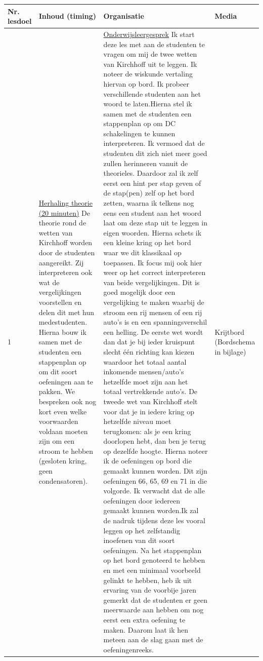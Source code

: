 \begin{landscape}
\begin{tabularx}{1.56\textwidth}{|p{1.5cm}|p{6cm}|X|p{3cm}|}
	\hline
	\textbf{Nr. lesdoel } & \textbf{Inhoud (timing)}  & \textbf{Organisatie } & \textbf{Media } \\ \hline
	1\newline 2 &\underline{Herhaling theorie (20 minuten)}\newline
	De theorie rond de wetten van Kirchhoff worden door de studenten aangereikt. Zij interpreteren ook wat de vergelijkingen voorstellen en delen dit met hun medestudenten. Hierna bouw ik samen met de studenten een stappenplan op om dit soort oefeningen aan te pakken. We bespreken ook nog kort even welke voorwaarden voldaan moeten zijn om een stroom te hebben (gesloten kring, geen condensatoren). 
	&  \underline{Onderwijsleergesprek}\newline 
	Ik start deze les met aan de studenten te vragen om mij de twee wetten van Kirchhoff uit te leggen. Ik noteer de wiskunde vertaling hiervan op bord. Ik probeer verschillende studenten aan het woord te laten.\newline Hierna stel ik samen met de studenten een stappenplan op om DC schakelingen te kunnen interpreteren. Ik vermoed dat de studenten dit zich niet meer goed zullen herinneren vanuit de theorieles. Daardoor zal ik zelf eerst een hint per stap geven of de stap(pen) zelf op het bord zetten, waarna ik telkens nog eens een student aan het woord laat om deze stap uit te leggen in eigen woorden. Hierna schets ik een kleine kring op het bord waar we dit klassikaal op toepassen.\newline
	Ik focus mij ook hier weer op het correct interpreteren van beide vergelijkingen. Dit is goed mogelijk door een vergelijking te maken waarbij de stroom een rij mensen of een rij auto's is en een spanningsverschil een helling. De eerste wet wordt dan  dat je bij ieder kruispunt slecht één richting kan kiezen waardoor het totaal aantal inkomende mensen/auto's hetzelfde moet zijn aan het totaal vertrekkende auto's. De tweede wet van Kirchhoff stelt voor dat je in iedere kring op hetzelfde niveau moet terugkomen: als je een kring doorlopen hebt, dan ben je terug op dezelfde hoogte.
	\newline 
	Hierna noteer ik de oefeningen op bord die gemaakt kunnen worden. Dit zijn oefeningen 66, 65, 69 en 71 in die volgorde. Ik verwacht dat de alle oefeningen door iedereen gemaakt kunnen worden.\newline Ik zal de nadruk tijdens deze les vooral leggen op het zelfstandig inoefenen van dit soort oefeningen. Na het stappenplan op het bord genoteerd te hebben en met een minimaal voorbeeld gelinkt te hebben, heb ik uit ervaring van de voorbije jaren gemerkt dat de studenten er geen meerwaarde aan hebben om nog eerst een extra oefening te maken. Daarom laat ik hen meteen aan de slag gaan met de oefeningenreeks.
	& Krijtbord (Bordschema in bijlage)
	\\ \hline
\end{tabularx}





\end{landscape}
